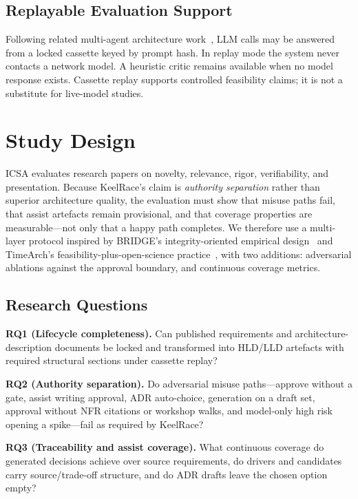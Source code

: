\documentclass[conference]{IEEEtran}
\begin{document}
\subsection{Replayable Evaluation Support}
Following related multi-agent architecture work~\cite{waseem2026timearch}, LLM calls may be answered from a locked cassette keyed by prompt hash.
In replay mode the system never contacts a network model.
A heuristic critic remains available when no model response exists.
Cassette replay supports controlled feasibility claims; it is not a substitute for live-model studies.

\section{Study Design}

ICSA evaluates research papers on novelty, relevance, rigor, verifiability, and presentation.
Because KeelRace's claim is \emph{authority separation} rather than superior architecture quality, the evaluation must show that misuse paths fail, that assist artefacts remain provisional, and that coverage properties are measurable---not only that a happy path completes.
We therefore use a multi-layer protocol inspired by BRIDGE's integrity-oriented empirical design~\cite{waseem2026bridge} and TimeArch's feasibility-plus-open-science practice~\cite{waseem2026timearch}, with two additions: adversarial ablations against the approval boundary, and continuous coverage metrics.

\subsection{Research Questions}

\noindent\textbf{RQ1 (Lifecycle completeness).}
Can published requirements and architecture-description documents be locked and transformed into HLD/LLD artefacts with required structural sections under cassette replay?

\noindent\textbf{RQ2 (Authority separation).}
Do adversarial misuse paths---approve without a gate, assist writing approval, ADR auto-choice, generation on a draft set, approval without NFR citations or workshop walks, and model-only high risk opening a spike---fail as required by KeelRace?

\noindent\textbf{RQ3 (Traceability and assist coverage).}
What continuous coverage do generated decisions achieve over source requirements, do drivers and candidates carry source/trade-off structure, and do ADR drafts leave the chosen option empty?
\end{document}
